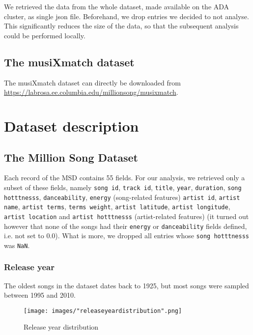 \documentclass[11pt]{article}
\renewcommand\_{\textunderscore\allowbreak}
\begin{document}
We retrieved the data from the whole dataset, made available on the ADA cluster, as single json file. Beforehand, we drop entries we decided to not analyse. 
This significantly reduces the size of the data, so that the subsequent analysis could be performed locally.

\subsection{The musiXmatch dataset}
The musiXmatch dataset can directly be downloaded from \url{https://labrosa.ee.columbia.edu/millionsong/musixmatch}.

\section{Dataset description}
\subsection{The Million Song Dataset}
Each record of the MSD contains 55 fields.
For our analysis, we retrieved only a subset of these fields, namely \texttt{song id}, \texttt{track id}, \texttt{title}, \texttt{year}, \texttt{duration}, \texttt{song hotttnesss}, \texttt{danceability}, \texttt{energy} (song-related features) \texttt{artist id}, \texttt{artist name}, \texttt{artist terms}, \texttt{terms weight}, \texttt{artist latitude},  \texttt{artist longitude}, \texttt{artist location} and \texttt{artist hotttnesss} (artist-related features) 
(it turned out however that none of the songs had their \texttt{energy} or \texttt{danceability} fields defined, i.e. not set to 0.0).
What is more, we dropped all entries whose \texttt{song hotttnesss} was \texttt{NaN}.

\subsubsection{Release year}
The oldest songs in the dataset dates back to 1925, but most songs were sampled between 1995 and 2010.

\begin{figure}[h!]
\centering
\captionsetup{width=1.0\textwidth}
\texttt{[image: images/"release\_year\_distribution".png]}
\caption{Release year distribution}
\label{fig:song_duration}
\end{figure}
\end{document}

